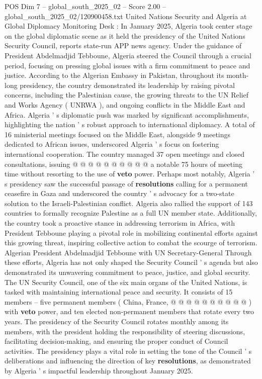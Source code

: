 \begin{textsample}{POS Dim 7 – global\_south\_2025\_02 – Score 2.00 – global\_south\_2025\_02/120900458.txt}  \label{ex:f7_pos_189}
United Nations Security and Algeria at Global Diplomacy Monitoring Desk : In January 2025, Algeria took center stage on the global diplomatic scene as it held the presidency of the United Nations Security Council, reports state-run APP news agency.
Under the guidance of President Abdelmadjid Tebboune, Algeria steered the Council through a crucial period, focusing on pressing global issues with a firm commitment to peace and justice.
According to the Algerian Embassy in Pakistan, throughout its month-long presidency, the country demonstrated its leadership by raising pivotal concerns, including the Palestinian cause, the growing threats to the UN Relief and Works Agency ( UNRWA ), and ongoing conflicts in the Middle East and Africa.
Algeria ' s diplomatic push was marked by significant accomplishments, highlighting the nation ' s robust approach to international diplomacy.
A total of 16 ministerial meetings focused on the Middle East, alongside 9 meetings dedicated to African issues, underscored Algeria ' s focus on fostering international cooperation.
The country managed 37 open meetings and closed consultations, issuing @ @ @ @ @ @ @ @ @ @ a notable 75 hours of meeting time without resorting to the use of \textbf{veto} power.
Perhaps most notably, Algeria ' s presidency saw the successful passage of \textbf{resolutions} calling for a permanent ceasefire in Gaza and underscored the country ' s advocacy for a two-state solution to the Israeli-Palestinian conflict.
Algeria also rallied the support of 143 countries to formally recognize Palestine as a full UN member state.
Additionally, the country took a proactive stance in addressing terrorism in Africa, with President Tebboune playing a pivotal role in mobilizing continental efforts against this growing threat, inspiring collective action to combat the scourge of terrorism.
Algerian President Abdelmadjid Tebboune with UN Secretary-General Through these efforts, Algeria has not only shaped the Security Council ' s agenda but also demonstrated its unwavering commitment to peace, justice, and global security.
The UN Security Council, one of the six main organs of the United Nations, is tasked with maintaining international peace and security.
It consists of 15 members -- five permanent members ( China, France, @ @ @ @ @ @ @ @ @ @ ) with \textbf{veto} power, and ten elected non-permanent members that rotate every two years.
The presidency of the Security Council rotates monthly among its members, with the president holding the responsibility of steering discussions, facilitating decision-making, and ensuring the proper conduct of Council activities.
The presidency plays a vital role in setting the tone of the Council ' s deliberations and influencing the direction of key \textbf{resolutions}, as demonstrated by Algeria ' s impactful leadership throughout January 2025.

\end{textsample}
